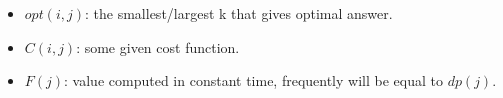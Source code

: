 \begin{itemize}
    \item $opt(i,j)$: the smallest/largest k that gives optimal answer.
    \item $C(i,j)$: some given cost function.
    \item $F(j)$: value computed in constant time, frequently will be equal to $dp(j)$.
\end{itemize}